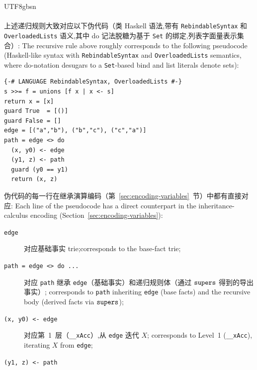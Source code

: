 \begin{CJK*}{UTF8}{gbsn}
\paragraph{}
\ifPaperChinese
上述递归规则大致对应以下伪代码（类 Haskell 语法,带有 \texttt{RebindableSyntax} 和 \texttt{OverloadedLists} 语义,其中 do 记法脱糖为基于 \texttt{Set} 的绑定,列表字面量表示集合）:
\else
The recursive rule above roughly corresponds to the
following pseudocode (Haskell-like syntax with
  \texttt{RebindableSyntax} and \texttt{OverloadedLists}
  semantics, where do-notation desugars to a
\texttt{Set}-based bind and list literals denote sets):
\fi
\begin{listing}[htbp]
  \caption{}
  \label{lst:datalog-monadic}
\begin{verbatim}
{-# LANGUAGE RebindableSyntax, OverloadedLists #-}
s >>= f = unions [f x | x <- s]
return x = [x]
guard True  = [()]
guard False = []
edge = [("a","b"), ("b","c"), ("c","a")]
path = edge <> do
  (x, y0) <- edge
  (y1, z) <- path
  guard (y0 == y1)
  return (x, z)
\end{verbatim}
\end{listing}
\noindent
\ifPaperChinese
伪代码的每一行在继承演算编码（第~\ref{sec:encoding-variables}~节）中都有直接对应:
\else
Each line of the pseudocode has a direct counterpart in
the inheritance-calculus encoding
(Section~\ref{sec:encoding-variables}):
\fi
\begin{description}
  \item[\texttt{edge}]
    \ifPaperChinese 对应基础事实 trie;\else corresponds to the base-fact trie;\fi
  \item[\texttt{path = edge <> do ...}]
    \ifPaperChinese
    对应 \texttt{path} 继承 \texttt{edge}（基础事实）和递归规则体（通过 $\mathtt{supers}$ 得到的导出事实）;
    \else
    corresponds to \texttt{path} inheriting \texttt{edge}
    (base facts) and the recursive body (derived facts via
    $\mathtt{supers}$);
    \fi
  \item[\texttt{(x, y0) <- edge}]
    \ifPaperChinese
    对应第~1~层（\texttt{__xAcc}）,从 \texttt{edge} 迭代 $X$;
    \else
    corresponds to Level~1 (\texttt{__xAcc}), iterating $X$
    from \texttt{edge};
    \fi
  \item[\texttt{(y1, z) <- path}]

\end{description}
\end{CJK*}
